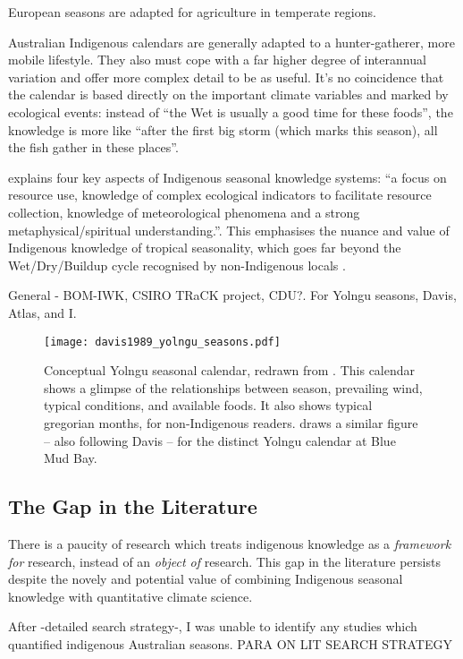 European seasons are adapted for agriculture in temperate regions.

Australian Indigenous calendars are generally adapted to a hunter-gatherer,
more mobile lifestyle.  They also must cope with a far higher degree of
interannual variation and offer more complex detail to be as useful.  It's no
coincidence that the calendar is based directly on the important climate
variables and marked by ecological events:  instead of ``the Wet is usually a
good time for these foods'', the knowledge is more like ``after the first big
storm (which marks this season), all the fish gather in these places''.

\citet{woodward2012b} explains four key aspects of Indigenous seasonal
knowledge systems: ``a focus on resource use, knowledge of complex
ecological indicators to facilitate resource collection, knowledge of
meteorological phenomena and a strong metaphysical/spiritual understanding.''.
This emphasises the nuance and value of Indigenous knowledge of tropical
seasonality, which goes far beyond the Wet/Dry/Buildup cycle recognised
by non-Indigenous locals \citep{willmett2009}.




General - BOM-IWK, CSIRO TRaCK project, CDU?.  For Yolngu seasons, Davis, Atlas, and I.


\begin{SCfigure}[][h]
    \centering
    \texttt{[image: davis1989\_yolngu\_seasons.pdf]}
    \caption[Conceptual Yolngu seasonal calendar \citep{davis1989}]{
        Conceptual Yolngu seasonal calendar, redrawn from \citet[p2]{davis1989}.
        This calendar shows a glimpse of the relationships between season,
        prevailing wind, typical conditions, and available foods.
        It also shows typical gregorian months, for non-Indigenous readers.
        \citet[][p.107]{barber2005} draws a similar figure -- also following
        Davis -- for the distinct Yolngu calendar at Blue Mud Bay.
        }
    \label{fig:yolngu-seasons}
\end{SCfigure}




\subsection{The Gap in the Literature}

There is a paucity of research which treats indigenous knowledge
as a \emph{framework for} research, instead of an \emph{object of} research.
This gap in the literature persists despite the novely and potential value
of combining Indigenous seasonal knowledge with quantitative climate science.

After -detailed search strategy-, I was unable to identify any studies which
quantified indigenous Australian seasons.  PARA ON LIT SEARCH STRATEGY



